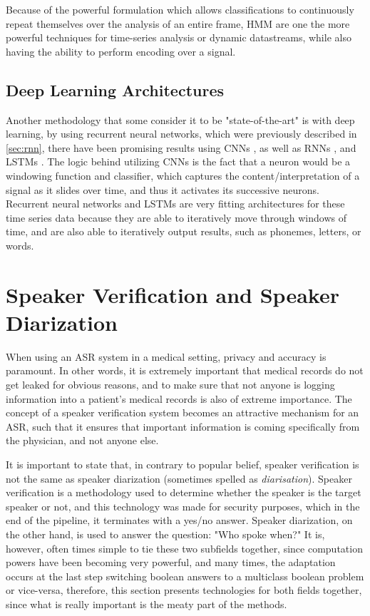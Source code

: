 Because of the powerful formulation which allows classifications to continuously repeat themselves over the analysis of an entire frame, HMM are one the more powerful techniques for time-series analysis or dynamic datastreams, while also having the ability to perform encoding over a signal.

\subsection{Deep Learning Architectures}
Another methodology that some consider it to be "state-of-the-art" is with deep learning, by using recurrent neural networks, which were previously described in \ref{sec:rnn}, there have been promising results using CNNs \cite{ASR_CNN_end2end}, as well as RNNs \cite{ASR_RNN} \cite{ASR_RNN_end2end}, and LSTMs \cite{ASR_LSTM}. The logic behind utilizing CNNs is the fact that a neuron would be a windowing function and classifier, which captures the content/interpretation of a signal as it slides over time, and thus it activates its successive neurons. Recurrent neural networks and LSTMs are very fitting architectures for these time series data because they are able to iteratively move through windows of time, and are also able to iteratively output results, such as phonemes, letters, or words.

\section{Speaker Verification and Speaker Diarization}
When using an ASR system in a medical setting, privacy and accuracy is paramount. In other words, it is extremely important that medical records do not get leaked for obvious reasons, and to make sure that not anyone is logging information into a patient's medical records is also of extreme importance. The concept of a speaker verification system becomes an attractive mechanism for an ASR, such that it ensures that important information is coming specifically from the physician, and not anyone else.

It is important to state that, in contrary to popular belief, speaker verification is not the same as speaker diarization (sometimes spelled as \textit{diarisation}). Speaker verification is a methodology used to determine whether the speaker is the target speaker or not, and this technology was made for security purposes, which in the end of the pipeline, it terminates with a yes/no answer. Speaker diarization, on the other hand, is used to answer the question: "Who spoke when?" It is, however, often times simple to tie these two subfields together, since computation powers have been becoming very powerful, and many times, the adaptation occurs at the last step switching boolean answers to a multiclass boolean problem or vice-versa, therefore, this section presents technologies for both fields together, since what is really important is the meaty part of the methods.


